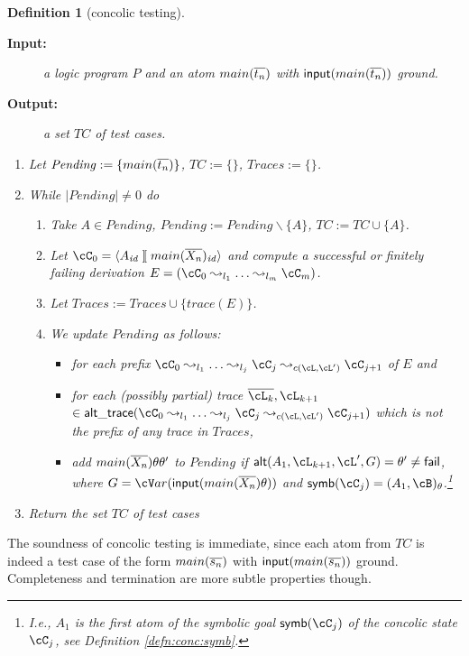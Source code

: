 \documentclass[fleqn]{tlp}
\newtheorem{definition}{Definition} \newtheorem{example}{Example} \newtheorem{lemma}{Lemma} \newtheorem{proposition}{Proposition} \newtheorem{theorem}{Theorem} \newtheorem{corollary}{Corollary}
\newcommand{\symb}{\mathsf{symb}}
\newcommand{\alt}{\mathsf{alt}}
\newcommand{\traces}{\mathit{Traces}}
\newcommand{\inp}{\mathsf{input}}
\newcommand{\trace}{\mathit{trace}}
\newcommand{\id}{{\mathit{id}}}
\newcommand{\alttrace}{\mathsf{alt\_trace}}
\newcommand{\fail}{\mathsf{fail}}
\newcommand{\sep}{\mathit{\;]\![\;}}
\newcommand{\var}{{\cV}ar}
\def \tuple#1{\langle #1 \rangle}
\begin{document}
\begin{definition}[concolic testing] \label{def:concolic}
  \begin{description}
  \item[\textbf{Input:}] a logic program $P$ and an atom
    $main(\overline{t_n})$ with $\inp(main(\ol{t_n}))$ ground.

  \item[\textbf{Output:}] a set $TC$ of test cases.
    
  \end{description}

  \begin{enumerate}
  \item Let $\mathit{Pending} :=\{main(\overline{t_n})\}$, $TC:=\{\}$,
    $\traces:=\{\}$.

  \item While $|Pending|\neq 0$ do
    \begin{enumerate}
    \item Take $A\in \mathit{Pending}$, $\mathit{Pending} :=
      \mathit{Pending} \backslash \{A\}$, $TC := TC\cup \{A\}$.

    \item 
      Let $\cC_0 = \tuple{A_\id\sep main(\ol{X_n})_\id}$ and 
      compute a successful or finitely failing derivation
      $
      E = (\cC_0 \leadsto_{l_1} \ldots \leadsto_{l_m} \cC_m)
      $. 
      
    \item Let $\traces :=
      \traces\cup\{\trace(E)\}$. 

    \item We update $\mathit{Pending}$ as follows:
      \begin{itemize}
      \item for each prefix $ \cC_0 \leadsto_{l_1} \ldots
        \leadsto_{l_j} \cC_j \leadsto_{c(\cL,\cL')} \cC_{j+1} $ of
        $E$ and
      \item for each (possibly partial) trace $\ol{\cL_{k}},\cL_{k+1}$
        $\in\alttrace(\cC_0 \leadsto_{l_1} \ldots \leadsto_{l_j} \cC_j
        \leadsto_{c(\cL,\cL')} \cC_{j+1})$ which is not the prefix of
        any trace in $\traces$, 
      \item add 
        $main(\overline{X_n})\theta\theta'$ to $\mathit{Pending}$ if $\alt(A_1,\cL_{k+1},\cL',G)=\theta'\neq\fail$, where
        $G=\var(\inp(main(\ol{X_n})\theta))$ and
        $\symb(\cC_j)= (A_1,\cB)_\theta$.\!\footnote{I.e., $A_1$ is
          the first atom of the symbolic goal $\symb(\cC_j)$ of the
          concolic state $\cC_j$, see Definition
          \ref{defn:conc:symb}. }
      \end{itemize}
    \end{enumerate}
  \item Return the set $TC$ of test cases
  \end{enumerate}
\end{definition}
The soundness of concolic testing is immediate, since 
each atom from $TC$ is indeed a test case 
of the form $main(\overline{s_n})$ with $\inp(main(\ol{s_n}))$ ground. 
Completeness and termination are more subtle properties though.
\end{document}
